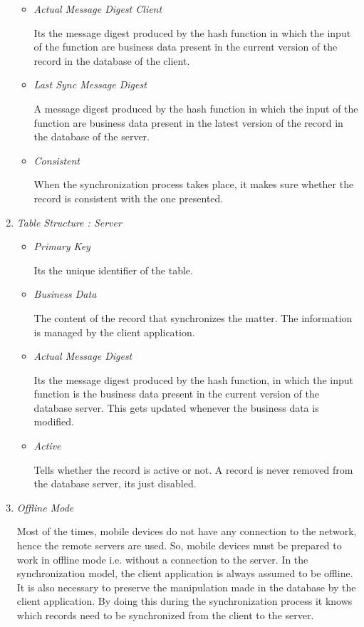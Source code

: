 \documentclass[conference]{IEEEtran}
\begin{document}
\begin{enumerate}[label=(\Alph*)]
\begin{itemize}
	\item \textit{Actual Message Digest Client}

Its the message digest produced by the hash function in which the input of the function are business data present in the current version of the record in the database of the client.

	\item \textit{Last Sync Message Digest}

A message digest produced by the hash function in which the input of the function are business data present in the latest version of the record in the database of the server.

	\item \textit{Consistent}

When the synchronization process takes place, it makes sure whether the record is consistent with the one presented.
\end{itemize}
	 

\item  \textit{Table Structure : Server}
\begin{itemize}
	\item \textit{Primary Key}

Its the unique identifier of the table.

	\item \textit{Business Data}

The content of the record that synchronizes the matter. The information is managed by the client application.

	\item \textit{Actual Message Digest}

Its the message digest produced by the hash function, in which the input function is the business data present in the current version of the database server. This gets updated whenever the business data is modified.


	\item \textit{Active}

Tells whether the record is active or not. A record is never removed from the database server, its just disabled.
\end{itemize}

\item  \textit{Offline Mode}

Most of the times, mobile devices do not have any connection to the network, hence the remote servers are used. So, mobile devices must be prepared to work in offline mode i.e. without a connection to the server. In the synchronization model, the client application is always assumed to be offline. It is also necessary to preserve the manipulation made in the database by the client application. By doing this during the synchronization process it knows which records need to be synchronized from the client to the server.


\end{enumerate}
\end{document}
